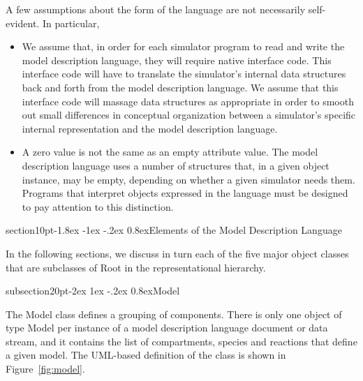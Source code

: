 \documentclass[10pt]{article}
\makeatletter
\renewcommand{\section}{\@startsection%
  {section}{1}{0pt}{-1.8ex \@plus -1ex \@minus -.2ex}%
  {0.8ex}{\normalfont\Large\bfseries}}
\renewcommand{\subsection}{\@startsection%
  {subsection}{2}{0pt}{-2ex \@plus 1ex \@minus -.2ex}%
  {0.8ex}{\slshape\large\bfseries}}
\newcommand{\class}[1]{\textsf{#1}}
\makeatother
\begin{document}
A few assumptions about the form of the language are not necessarily
self-evident.  In particular,
\begin{itemize}
  
\item We assume that, in order for each simulator program to read and write
  the model description language, they will require native interface code.
  This interface code will have to translate the simulator's internal data
  structures back and forth from the model description language.  We assume
  that this interface code will massage data structures as appropriate in
  order to smooth out small differences in conceptual organization between
  a simulator's specific internal representation and the model description
  language.

\item A zero value is not the same as an empty attribute value.  The model
  description language uses a number of structures that, in a given object
  instance, may be empty, depending on whether a given simulator needs
  them.  Programs that interpret objects expressed in the language must be
  designed to pay attention to this distinction.

\end{itemize}

\section{Elements of the Model Description Language}
\label{sec:elements}

In the following sections, we discuss in turn each of the five major object
classes that are subclasses of \class{Root} in the representational
hierarchy.


\subsection{Model}

The \class{Model} class defines a grouping of components.  There is only
one object of type \class{Model} per instance of a model description
language document or data stream, and it contains the list of compartments,
species and reactions that define a given model.  The UML-based definition
of the class is shown in Figure~\ref{fig:model}.
\end{document}
